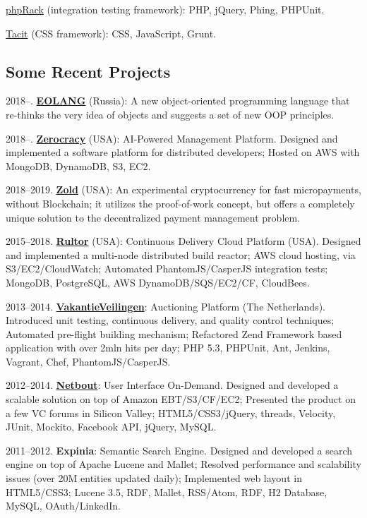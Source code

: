 \href{https://www.phprack.com}{phpRack} (integration testing framework):
PHP, jQuery, Phing, PHPUnit.

\href{https://github.com/yegor256/tacit}{Tacit} (CSS framework):
CSS, JavaScript, Grunt.

\subsection*{Some Recent Projects}

2018--. \href{https://www.eolang.org}{\textbf{EOLANG}} (Russia): A new object-oriented
programming language that re-thinks the very idea of objects
and suggests a set of new OOP principles.

2018--. \href{https://www.zerocracy.com}{\textbf{Zerocracy}} (USA): AI-Powered Management Platform.
Designed and implemented a software platform for distributed developers;
Hosted on AWS with MongoDB, DynamoDB, S3, EC2.

2018--2019. \href{https://www.zold.io}{\textbf{Zold}} (USA): An experimental cryptocurrency for
fast micropayments, without Blockchain; it utilizes the proof-of-work
concept, but offers a completely unique solution to the decentralized
payment management problem.

2015--2018. \href{https://www.rultor.com}{\textbf{Rultor}} (USA): Continuous Delivery Cloud Platform (USA).
Designed and implemented a multi-node distributed build reactor;
AWS cloud hosting, via S3/EC2/CloudWatch;
Automated PhantomJS/CasperJS integration tests;
MongoDB, PostgreSQL, AWS DynamoDB/SQS/EC2/CF, CloudBees.

2013--2014. \href{https://www.VakantieVeilingen.nl}{\textbf{VakantieVeilingen}}: Auctioning Platform (The Netherlands).
Introduced unit testing, continuous delivery, and quality control techniques;
Automated pre-flight building mechanism;
Refactored Zend Framework based application with over 2mln hits per day;
PHP 5.3, PHPUnit, Ant, Jenkins, Vagrant, Chef, PhantomJS/CasperJS.

2012--2014. \href{https://www.netbout.com}{\textbf{Netbout}}: User Interface On-Demand.
Designed and developed a scalable solution on top of Amazon EBT/S3/CF/EC2;
Presented the product on a few VC forums in Silicon Valley;
HTML5/CSS3/jQuery, threads, Velocity, JUnit, Mockito, Facebook API, jQuery, MySQL.

2011--2012. \textbf{Expinia}: Semantic Search Engine.
Designed and developed a search engine on top of Apache Lucene and Mallet;
Resolved performance and scalability issues (over 20M entities updated daily);
Implemented web layout in HTML5/CSS3;
Lucene 3.5, RDF, Mallet, RSS/Atom, RDF, H2 Database, MySQL, OAuth/LinkedIn.

